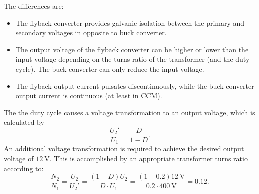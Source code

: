 \begin{solutionblock}
	The differences are:
	\begin{itemize}
		\setlength{\itemsep}{-0.5pt} %
		      \setlength{\parskip}{-0.5pt} %
		\item The flyback converter provides galvanic isolation between the primary and secondary voltages in opposite to buck converter.
		\item The output voltage of the flyback converter can be higher or lower than the input voltage depending on the turns ratio of the transformer (and the duty cycle). The buck converter can only reduce the input voltage.
		\item The flyback output current pulsates discontinuously, while the buck converter output current is continuous (at least in CCM).
	\end{itemize}
\end{solutionblock}


\begin{solutionblock}
	The the duty cycle causes a voltage transformation to an output voltage, which is calculated by
	\begin{equation*}
		\frac{U_\mathrm{2}'}{U_\mathrm{1}} = \frac{D}{1-D}.
	\end{equation*}
	An additional voltage transformation is required to achieve the desired output voltage of $\SI{12}{\volt}$.
	This is accomplished by an appropriate transformer turns ratio according to:
	\begin{equation*}
		\frac{N_\mathrm{2}}{N_\mathrm{1}} = \frac{U_\mathrm{2}}{U_\mathrm{2}'} =  \frac{(1-D)U_\mathrm{2}}{D \cdot U_\mathrm{1}}
		=  \frac{(1-0.2)\SI{12}{\volt}}{0.2 \cdot \SI{400}{\volt}} = 0.12.
	\end{equation*}
\end{solutionblock}


